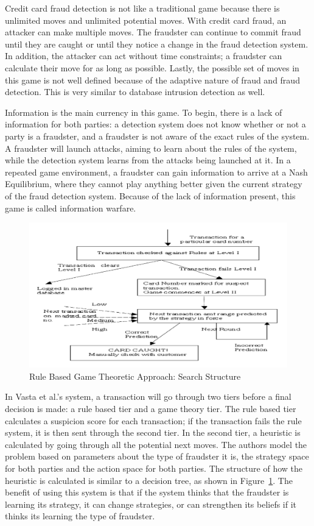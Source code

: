 \documentclass[midd]{thesis}
\begin{document}
Credit card fraud detection is not like a traditional game because there is unlimited moves and unlimited potential moves. With credit card fraud, an attacker can make multiple moves. The fraudster can continue to commit fraud until they are caught or until they notice a change in the fraud detection system. In addition, the attacker can act without time constraints; a fraudster can calculate their move for as long as possible. Lastly, the possible set of moves in this game is not well defined because of the adaptive nature of fraud and fraud detection. This is very similar to database intrusion detection as well.
  

Information is the main currency in this game. To begin, there is a lack of information for both parties: a detection system does not know whether or not a party is a fraudster, and a fraudster is not aware of the exact rules of the system. A fraudster will launch attacks, aiming to learn about the rules of the system, while the detection system learns from the attacks being launched at it. In a repeated game environment, a fraudster can gain information to arrive at a Nash Equilibrium, where they cannot play anything better given the current strategy of the fraud detection system. Because of the lack of information present, this game is called information warfare.


\begin{figure} \centering
  \includegraphics[scale=0.75]{gametheory.png}
  \caption{Rule Based Game Theoretic Approach: Search Structure \cite{Vatsa2007}}
  \label{fig:gametheory1}
\end{figure}

In Vasta et al.'s system, a transaction will go through two tiers before a final decision is made: a rule based tier and a game theory tier. The rule based tier calculates a suspicion score for each transaction; if the transaction fails the rule system, it is then sent through the second tier. In the second tier, a heuristic is calculated by going through all the potential next moves. The authors model the problem based on parameters about the type of fraudster it is, the strategy space for both parties and the action space for both parties. The structure of how the heuristic is calculated is similar to a decision tree, as shown in Figure~\ref{fig:gametheory1}. The benefit of using this system is that if the system thinks that the fraudster is learning its strategy, it can change strategies, or can strengthen its beliefs if it thinks its learning the type of fraudster.    
\end{document}
